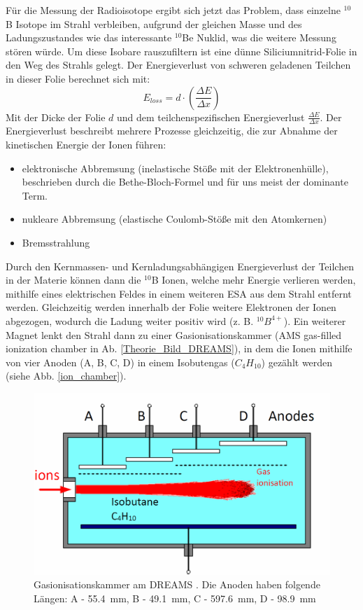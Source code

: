Für die Messung der Radioisotope ergibt sich jetzt das Problem, dass einzelne $^{10}$B Isotope im Strahl verbleiben, aufgrund der gleichen Masse und des Ladungszustandes wie das interessante $^{10}$Be Nuklid, was die weitere Messung stören würde.
Um diese Isobare rauszufiltern ist eine dünne Siliciumnitrid-Folie in den Weg des Strahls gelegt.
Der Energieverlust von schweren geladenen Teilchen in dieser Folie berechnet sich mit:
\begin{equation}
E_{loss} = d \cdot \left( \frac{\Delta E}{\Delta x} \right)
\end{equation}
Mit der Dicke der Folie $d$ und dem teilchenspezifischen Energieverlust $\frac{\Delta E}{\Delta x}$.
Der Energieverlust beschreibt mehrere Prozesse gleichzeitig, die zur Abnahme der kinetischen Energie der Ionen führen:
\begin{itemize}
    \item elektronische Abbremsung (inelastische Stöße mit der Elektronenhülle), beschrieben durch die Bethe-Bloch-Formel und für uns meist der dominante Term.
    \item nukleare Abbremsung (elastische Coulomb-Stöße mit den Atomkernen)
    \item Bremsstrahlung
\end{itemize}
Durch den Kernmassen- und Kernladungsabhängigen Energieverlust der Teilchen in der Materie können dann die $^{10}$B Ionen, welche mehr Energie verlieren werden, mithilfe eines elektrischen Feldes in einem weiteren ESA aus dem Strahl entfernt werden.
Gleichzeitig werden innerhalb der Folie weitere Elektronen der Ionen abgezogen, wodurch die Ladung weiter positiv wird (z. B. $^{10}B^{4+}$).
Ein weiterer Magnet lenkt den Strahl dann zu einer Gasionisationskammer (AMS gas-filled ionization chamber in Ab. \ref{Theorie_Bild_DREAMS}), in dem die Ionen mithilfe von vier Anoden (A, B, C, D) in einem Isobutengas ($C_{4}H_{10}$) gezählt werden (siehe Abb. \ref{ion_chamber}).
\begin{figure}[ht]
  \includegraphics[width=0.95\linewidth]{../Bilder/ion_chamber.png}
  \caption{Gasionisationskammer am DREAMS \cite{Bild_Ionisationskammer}. Die Anoden haben folgende Längen: A - \SI{55.4}{\milli\metre}, B - \SI{49.1}{\milli\metre}, C - \SI{597.6}{\milli\metre}, D - \SI{98.9}{\milli\metre}}
  \label{Theorie_ion_chamber}
\end{figure}
\clearpage
